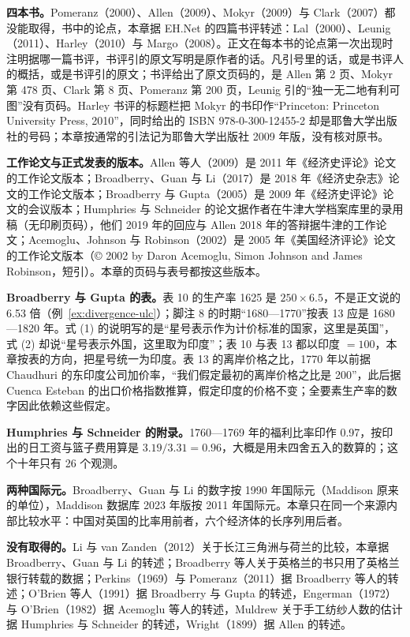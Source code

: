 \begin{deeper}[版本与史料的出入]
\textbf{四本书。}Pomeranz（2000）、Allen（2009）、Mokyr（2009）与 Clark（2007）都没能取得，书中的论点，本章据 EH.Net 的四篇书评转述：Lal（2000）、Leunig（2011）、Harley（2010）与 Margo（2008）。正文在每本书的论点第一次出现时注明据哪一篇书评，书评引的原文写明是原作者的话。凡引号里的话，或是书评人的概括，或是书评引的原文；书评给出了原文页码的，是 Allen 第 2 页、Mokyr 第 478 页、Clark 第 8 页、Pomeranz 第 200 页，Leunig 引的“独一无二地有利可图”没有页码。Harley 书评的标题栏把 Mokyr 的书印作“Princeton: Princeton University Press, 2010”，同时给出的 ISBN 978-0-300-12455-2 却是耶鲁大学出版社的号码；本章按通常的引法记为耶鲁大学出版社 2009 年版，没有核对原书\cite{harley2010}。

\textbf{工作论文与正式发表的版本。}Allen 等人（2009）是 2011 年《经济史评论》论文的工作论文版本；Broadberry、Guan 与 Li（2017）是 2018 年《经济史杂志》论文的工作论文版本；Broadberry 与 Gupta（2005）是 2009 年《经济史评论》论文的会议版本；Humphries 与 Schneider 的论文据作者在牛津大学档案库里的录用稿（无印刷页码），他们 2019 年的回应与 Allen 2018 年的答辩据牛津的工作论文；Acemoglu、Johnson 与 Robinson（2002）是 2005 年《美国经济评论》论文的工作论文版本（© 2002 by Daron Acemoglu, Simon Johnson and James Robinson，短引）。本章的页码与表号都按这些版本。

\textbf{Broadberry 与 Gupta 的表。}表 10 的生产率 1625 是 $250\times6.5$，不是正文说的 6.53 倍（例~\ref{ex:divergence-ulc}）；脚注 8 的时期“1680—1770”按表 13 应是 1680—1820 年。式 (1) 的说明写的是“星号表示作为计价标准的国家，这里是英国”，式 (2) 却说“星号表示外国，这里取为印度”；表 10 与表 13 都以印度 $=100$，本章按表的方向，把星号统一为印度\cite{bg2005}。表 13 的离岸价格之比，1770 年以前据 Chaudhuri 的东印度公司加价率，“我们假定最初的离岸价格之比是 200”\cite{bg2005}，此后据 Cuenca Esteban 的出口价格指数推算，假定印度的价格不变；全要素生产率的数字因此依赖这些假定。

\textbf{Humphries 与 Schneider 的附录。}1760—1769 年的福利比率印作 0.97，按印出的日工资与篮子费用算是 $3.19/3.31=0.96$，大概是用未四舍五入的数算的；这个十年只有 26 个观测\cite{humphries2019spin}。

\textbf{两种国际元。}Broadberry、Guan 与 Li 的数字按 1990 年国际元（Maddison 原来的单位），Maddison 数据库 2023 年版按 2011 年国际元。本章只在同一个来源内部比较水平：中国对英国的比率用前者，六个经济体的长序列用后者。

\textbf{没有取得的。}Li 与 van Zanden（2012）关于长江三角洲与荷兰的比较，本章据 Broadberry、Guan 与 Li 的转述；Broadberry 等人关于英格兰的书只用了英格兰银行转载的数据；Perkins（1969）与 Pomeranz（2011）据 Broadberry 等人的转述；O'Brien 等人（1991）据 Broadberry 与 Gupta 的转述，Engerman（1972）与 O'Brien（1982）据 Acemoglu 等人的转述，Muldrew 关于手工纺纱人数的估计据 Humphries 与 Schneider 的转述，Wright（1899）据 Allen 的转述。
\end{deeper}

